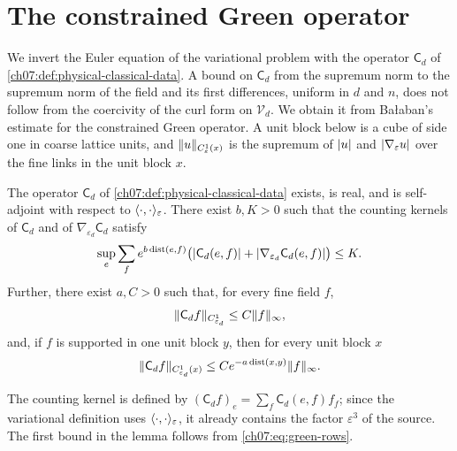 \section{The constrained Green operator}\label{ch07:sec:green}

We invert the Euler equation of the variational problem with the operator $\mathsf C_d$ of \cref{ch07:def:physical-classical-data}. A bound on $\mathsf C_d$ from the supremum norm to the supremum norm of the field and its first differences, uniform in $d$ and $n$, does not follow from the coercivity of the curl form on $\mathcal V_d$. We obtain it from Ba{\l}aban's estimate for the constrained Green operator. A unit block below is a cube of side one in coarse lattice units, and $\lVert u\rVert_{C^1_\varepsilon(x)}$ is the supremum of $\lvert u\rvert$ and $\lvert \nabla_\varepsilon u\rvert$ over the fine links in the unit block $x$.

\begin{lemma}\label{ch07:lem:green-rows}
The operator $\mathsf C_d$ of \cref{ch07:def:physical-classical-data} exists, is real, and is self-adjoint with respect to $\langle \cdot,\cdot\rangle_\varepsilon$. There exist $b,K>0$ such that the counting kernels of $\mathsf C_d$ and of $\nabla_{\varepsilon_d}\mathsf C_d$ satisfy
\begin{equation}\label{ch07:eq:green-rows}
 \sup_e\sum_f e^{b\operatorname{dist}(e,f)}
 \bigl(\lvert \mathsf C_d(e,f)\rvert+\lvert \nabla_{\varepsilon_d}\mathsf C_d(e,f)\rvert\bigr)\le K.
\end{equation}
Further, there exist $a,C>0$ such that, for every fine field $f$,
\[
 \lVert \mathsf C_df\rVert_{C^1_{\varepsilon_d}}\le C\lVert f\rVert_\infty,
\]
and, if $f$ is supported in one unit block $y$, then for every unit block $x$
\[
 \lVert \mathsf C_df\rVert_{C^1_{\varepsilon_d}(x)}\le Ce^{-a\operatorname{dist}(x,y)}\lVert f\rVert_\infty .
\]
\end{lemma}

The counting kernel is defined by $(\mathsf C_df)_e=\sum_f\mathsf C_d(e,f)f_f$; since the variational definition uses $\langle \cdot,\cdot\rangle_\varepsilon$, it already contains the factor $\varepsilon^3$ of the source. The first bound in the lemma follows from \eqref{ch07:eq:green-rows}.


